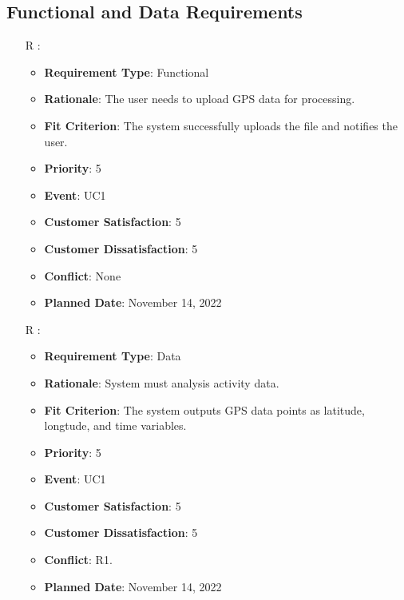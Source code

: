 \documentclass[12pt, titlepage]{article}
\newcounter{reqnum} %
\begin{document}
\subsection{Functional and Data Requirements}
\noindent \begin{itemize}

\item[R\refstepcounter{reqnum}\thereqnum
\label{R_Inputs_1}:] 
\begin{itemize}
    \item \textbf{Requirement Type}: Functional
    \item \textbf{Rationale}: The user needs to upload GPS data for processing.
    \item \textbf{Fit Criterion}: The system successfully uploads the file and notifies the user.
    \item \textbf{Priority}: 5
    \item \textbf{Event}: UC1
    \item \textbf{Customer Satisfaction}: 5
    \item \textbf{Customer Dissatisfaction}: 5
    \item \textbf{Conflict}: None
    \item \textbf{Planned Date}: November 14, 2022
\end{itemize}

\item[R\refstepcounter{reqnum}\thereqnum
\label{R_Inputs_1}:] 
\begin{itemize}
    \item \textbf{Requirement Type}: Data
    \item \textbf{Rationale}: System must analysis activity data.
    \item \textbf{Fit Criterion}: The system outputs GPS data points as latitude, longtude, and time variables. 
    \item \textbf{Priority}: 5
    \item \textbf{Event}: UC1
    \item \textbf{Customer Satisfaction}: 5
    \item \textbf{Customer Dissatisfaction}: 5
    \item \textbf{Conflict}: R1.
    \item \textbf{Planned Date}: November 14, 2022
\end{itemize}


\end{itemize}
\end{document}
